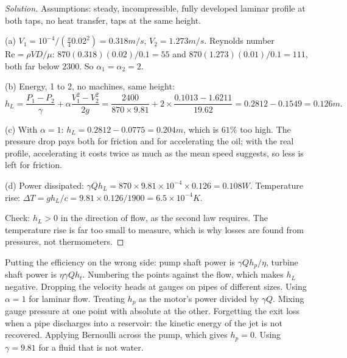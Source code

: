 \begin{proof}[Solution]
Assumptions: steady, incompressible, fully developed laminar profile at both taps, no heat transfer, taps at the same height.

(a) $V_1 = 10^{-4}/(\tfrac{\pi}{4}0.02^2) = 0.318\unit{m/s}$, $V_2 = 1.273\unit{m/s}$. Reynolds number $\mathrm{Re} = \rho VD/\mu$: $870(0.318)(0.02)/0.1 = 55$ and $870(1.273)(0.01)/0.1 = 111$, both far below $2300$. So $\alpha_1 = \alpha_2 = 2$.

(b) Energy, 1 to 2, no machines, same height:
\[
h_L = \frac{P_1 - P_2}{\gamma} + \alpha\frac{V_1^2 - V_2^2}{2g} = \frac{2400}{870\times9.81} + 2\times\frac{0.1013 - 1.6211}{19.62} = 0.2812 - 0.1549 = 0.126\unit{m}.
\]

(c) With $\alpha = 1$: $h_L = 0.2812 - 0.0775 = 0.204\unit{m}$, which is $61\%$ too high. The pressure drop pays both for friction and for accelerating the oil; with the real profile, accelerating it costs twice as much as the mean speed suggests, so less is left for friction.

(d) Power dissipated: $\gamma Qh_L = 870\times9.81\times10^{-4}\times0.126 = 0.108\unit{W}$. Temperature rise: $\Delta T = gh_L/c = 9.81\times0.126/1900 = 6.5\times10^{-4}\unit{K}$.

Check: $h_L > 0$ in the direction of flow, as the second law requires. The temperature rise is far too small to measure, which is why losses are found from pressures, not thermometers.
\end{proof}

\begin{trap}
Putting the efficiency on the wrong side: pump shaft power is $\gamma Qh_p/\eta$, turbine shaft power is $\eta\gamma Qh_t$. Numbering the points against the flow, which makes $h_L$ negative. Dropping the velocity heads at gauges on pipes of different sizes. Using $\alpha = 1$ for laminar flow. Treating $h_p$ as the motor's power divided by $\gamma Q$. Mixing gauge pressure at one point with absolute at the other. Forgetting the exit loss when a pipe discharges into a reservoir: the kinetic energy of the jet is not recovered. Applying Bernoulli across the pump, which gives $h_p = 0$. Using $\gamma = 9.81$ for a fluid that is not water.
\end{trap}

